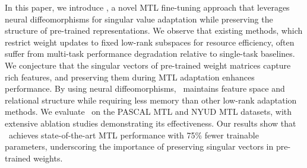 In this paper, we introduce \ourmethod, a novel MTL fine-tuning approach that leverages neural diffeomorphisms for singular value adaptation while preserving the structure of pre-trained representations. We observe that existing methods, which restrict weight updates to fixed low-rank subspaces for resource efficiency, often suffer from multi-task performance degradation relative to single-task baselines. We conjecture that the singular vectors of pre-trained weight matrices capture rich features, and preserving them during MTL adaptation enhances performance. By using neural diffeomorphisms, \ourmethod\ maintains feature space and relational structure while requiring less memory than other low-rank adaptation methods. We evaluate \ourmethod\ on the PASCAL MTL and NYUD MTL datasets, with extensive ablation studies demonstrating its effectiveness. Our results show that \ourmethod\ achieves state-of-the-art MTL performance with 75\% fewer trainable parameters, underscoring the importance of preserving singular vectors in pre-trained weights.

